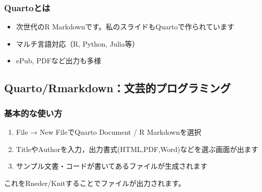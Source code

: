 \documentclass[
  a4paper,
]{ltjsbook}
\providecommand{\tightlist}{%
  \setlength{\itemsep}{0pt}\setlength{\parskip}{0pt}}\usepackage{longtable,booktabs,array}
\begin{document}
\subsubsection{Quartoとは}\label{quartoux3068ux306f}

\begin{itemize}
\tightlist
\item
  次世代のR Markdownです。私のスライドもQuartoで作られています
\item
  マルチ言語対応（R, Python, Julia等）
\item
  ePub, PDFなど出力も多様
\end{itemize}

\subsection{Quarto/Rmarkdown：文芸的プログラミング}\label{quartormarkdownux6587ux82b8ux7684ux30d7ux30edux30b0ux30e9ux30dfux30f3ux30b0-1}

\subsubsection{基本的な使い方}\label{ux57faux672cux7684ux306aux4f7fux3044ux65b9-1}

\begin{enumerate}
\def\labelenumi{\arabic{enumi}.}
\tightlist
\item
  File → New FileでQuarto Document / R Markdownを選択
\item
  TitleやAuthorを入力，出力書式(HTML,PDF,Word)などを選ぶ画面が出ます
\item
  サンプル文書・コードが書いてあるファイルが生成されます
\end{enumerate}

これをRneder/Knitすることでファイルが出力されます。
\end{document}
